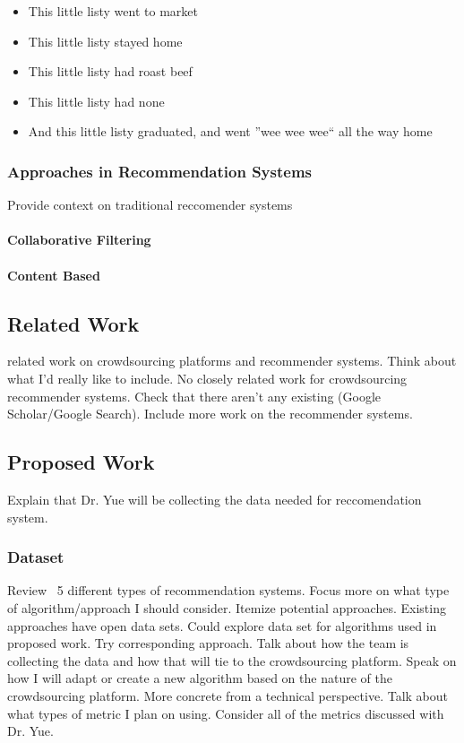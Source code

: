 \documentclass[letterpaper,12pt]{article}
\begin{document}
\begin{itemize}
	\item This little listy went to market
	\item This little listy stayed home
	\item This little listy had roast beef
	\item This little listy had none
	\item And this little listy graduated, and went ''wee wee wee`` all the way home
\end{itemize}

\subsubsection{Approaches in Recommendation Systems}
Provide context on traditional reccomender systems

\paragraph{Collaborative Filtering}

\paragraph{Content Based}

\subsection{Related Work}
related work on crowdsourcing platforms and recommender systems. Think about what I’d really like to include. No closely related work for crowdsourcing recommender systems.  Check that there aren’t any existing (Google Scholar/Google Search). Include more work on the recommender systems.

\subsection{Proposed Work}
Explain that Dr. Yue will be collecting the data needed for reccomendation system.
\subsubsection{Dataset}

Review ~5 different types of recommendation systems. Focus more on what type of algorithm/approach I should consider. Itemize potential approaches. Existing approaches have open data sets. Could explore data set for algorithms used in proposed work. Try corresponding approach. Talk about how the team is collecting the data and how that will tie to the crowdsourcing platform. Speak on how I will adapt or create a new algorithm based on the nature of the crowdsourcing platform. More concrete from a technical perspective. Talk about what types of metric I plan on using. Consider all of the metrics discussed with Dr. Yue.
\end{document}

